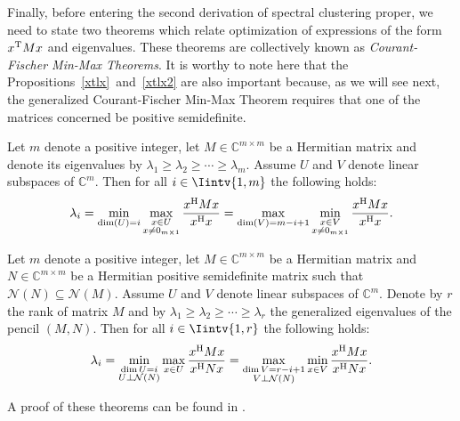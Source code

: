 Finally, before entering the second derivation of spectral clustering proper, we need to state two theorems which relate optimization of expressions of the form $x^{\rm T}Mx$ and eigenvalues.
These theorems are collectively known as \textit{Courant-Fischer Min-Max Theorems}.
   It is worthy to note here that the Propositions~\ref{xtlx}~and~\vref{xtlx2} are also important because, as we will see next, the generalized Courant-Fischer Min-Max Theorem requires that one of the matrices concerned be positive semidefinite. 

\begin{theorem} \label{minmax1}
   Let $m$ denote a positive integer, let $M \in \mathbb{C}^{m \times m}$ be a Hermitian matrix and denote its eigenvalues by $\lambda_1 \ge \lambda_2 \ge \cdots \ge \lambda_m$. 
   Assume $U$ and $V$ denote linear subspaces of $\mathbb C^{m }$.
   Then for all $i \in \Iintv{1,m}$ the following holds:
\begin{equation}
   \lambda_i = \min_{\dim (U) = i} \max_{\substack{x \in U \\ x \ne 0_{m \times 1}}} \frac{x^{\rm H}Mx}{x^{\rm H}x} = \max_{\dim (V) = m-i+1} \min_{\substack{x \in V \\ x \ne 0_{m \times 1}}} \frac{x^{\rm H}Mx}{x^{\rm H}x}.
\end{equation}
\end{theorem}

\begin{theorem} \label{minmax2}
   Let $m$ denote a positive integer, let $M \in \mathbb {C} ^{m \times m}$ be a Hermitian matrix and $N \in \mathbb C ^{m \times m}$ be a Hermitian positive semidefinite matrix such that $\mathcal N (N)  \subseteq \mathcal N (M)$.
   Assume $U$ and $V$ denote linear subspaces of $\mathbb C^{m }$.
   Denote by $r$ the rank of matrix $M$ and by $\lambda_1 \ge \lambda_2 \ge \cdots \ge \lambda_r$ the generalized eigenvalues of the pencil $(M,N)$.
   Then for all $i \in \Iintv{1,r}$ the following holds:
   \begin{equation}
      \lambda_i = \min_{\substack{ \dim U = i \\ U \bot \mathcal N (N)}} \max_{x \in U} \frac{x^{\rm H}Mx}{x^{\rm H}Nx} = \max_{\substack{\dim  V = r - i + 1 \\ V \bot \mathcal N (N)}} \min_{x \in V} \frac{x^{\rm H}Mx}{x^{\rm H}Nx}.
   \end{equation}
\end{theorem}

A proof of these theorems can be found in \cite{minmax}.

